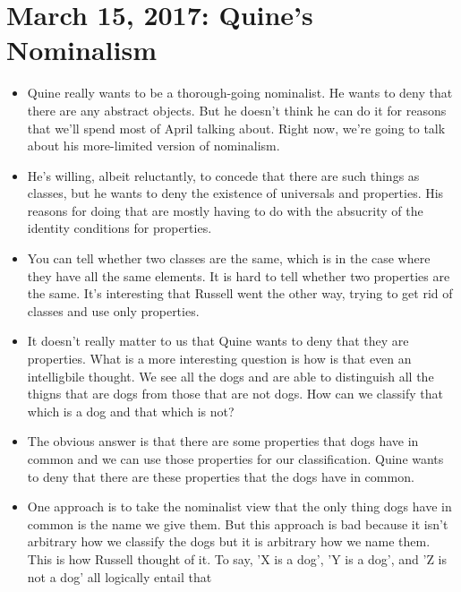 \documentclass[12pt]{article}
\theoremstyle{definition}
\begin{document}
\begin{itemize}
\end{itemize}

\section{March 15, 2017: Quine's Nominalism}

\begin{itemize}
    \itemsep0em 
    \item 
        Quine really wants to be a thorough-going nominalist. He wants to deny
        that there are any abstract objects. But he doesn't think he can do it
        for reasons that we'll spend most of April talking about. Right now,
        we're going to talk about his more-limited version of nominalism. 
    \item
        He's willing, albeit reluctantly, to concede that there are such things
        as classes, but he wants to deny the existence of universals and
        properties. His reasons for doing that are mostly having to do with the
        absucrity of the identity conditions for properties.
    \item
        You can tell whether two classes are the same, which is in the case
        where they have all the same elements. It is hard to tell whether two
        properties are the same. It's interesting that Russell went the other
        way, trying to get rid of classes and use only properties.
    \item
        It doesn't really matter to us that Quine wants to deny that they are
        properties. What is a more interesting question is how is that even an
        intelligbile thought. We see all the dogs and are able to distinguish
        all the thigns that are dogs from those that are not dogs. How can we
        classify that which is a dog and that which is not? 
    \item
        The obvious answer is that there are some properties that dogs have in
        common and we can use those properties for our classification. Quine
        wants to deny that there are these properties that the dogs have in
        common. 
    \item
        One approach is to take the nominalist view that the only thing dogs
        have in common is the name we give them. But this approach is bad
        because it isn't arbitrary how we classify the dogs but it is arbitrary
        how we name them. This is how Russell thought of it. To say, 'X is a
        dog', 'Y is a dog', and 'Z is not a dog' all logically entail that

\end{itemize}
\end{document}
